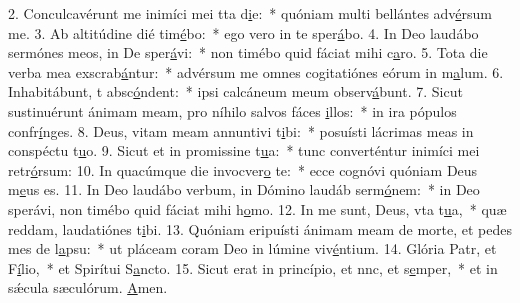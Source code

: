 2. Conculcavérunt me inimíci mei tta d\uline{i}e:~* quóniam multi bellántes adv\uline{é}rsum me.
3. Ab altitúdine dié tim\uline{é}bo:~* ego vero in te sper\uline{á}bo.
4. In Deo laudábo sermónes meos, in De sper\uline{á}vi:~* non timébo quid fáciat mihi c\uline{a}ro.
5. Tota die verba mea exscrab\uline{á}ntur:~* advérsum me omnes cogitatiónes eórum in m\uline{a}lum.
6. Inhabitábunt, t absc\uline{ó}ndent:~* ipsi calcáneum meum observ\uline{á}bunt.
7. Sicut sustinuérunt ánimam meam, pro níhilo salvos fáces \uline{i}llos:~* in ira pópulos confr\uline{í}nges.
8. Deus, vitam meam annuntivi t\uline{i}bi:~* posuísti lácrimas meas in conspéctu t\uline{u}o.
9. Sicut et in promissine t\uline{u}a:~* tunc converténtur inimíci mei retr\uline{ó}rsum:
10. In quacúmque die invocver\uline{o} te:~* ecce cognóvi quóniam Deus m\uline{e}us es.
11. In Deo laudábo verbum, in Dómino laudáb serm\uline{ó}nem:~* in Deo sperávi, non timébo quid fáciat mihi h\uline{o}mo.
12. In me sunt, Deus, vta t\uline{u}a,~* quæ reddam, laudatiónes t\uline{i}bi.
13. Quóniam eripuísti ánimam meam de morte, et pedes mes de l\uline{a}psu:~* ut pláceam coram Deo in lúmine viv\uline{é}ntium.
14. Glória Patr, et F\uline{í}lio,~* et Spirítui S\uline{a}ncto.
15. Sicut erat in princípio, et nnc, et s\uline{e}mper,~* et in sǽcula sæculórum. \uline{A}men.
